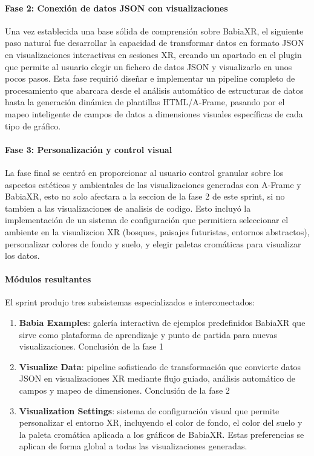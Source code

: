 \documentclass[a4paper, 12pt]{book}
\begin{document}
\paragraph{Fase 2: Conexión de datos JSON con visualizaciones}
Una vez establecida una base sólida de comprensión sobre BabiaXR, el siguiente paso natural fue desarrollar la capacidad de transformar datos en formato JSON en visualizaciones interactivas en sesiones XR, creando un apartado en el plugin que permite al usuario elegir un fichero de datos JSON y visualizarlo en unos pocos pasos. Esta fase requirió diseñar e implementar un pipeline completo de procesamiento que abarcara desde el análisis automático de estructuras de datos hasta la generación dinámica de plantillas HTML/A-Frame, pasando por el mapeo inteligente de campos de datos a dimensiones visuales específicas de cada tipo de gráfico.

\paragraph{Fase 3: Personalización y control visual}
La fase final se centró en proporcionar al usuario control granular sobre los aspectos estéticos y ambientales de las visualizaciones generadas con A-Frame y BabiaXR, esto no solo afectara a la seccion de la fase 2 de este sprint, si no tambien a las visualizaciones de analisis de codigo. Esto incluyó la implementación de un sistema de configuración que permitiera seleccionar el ambiente en la visualizcion XR (bosques, paisajes futuristas, entornos abstractos), personalizar colores de fondo y suelo, y elegir paletas cromáticas para visualizar los datos.


\paragraph{Módulos resultantes}
El sprint produjo tres subsistemas especializados e interconectados:
\begin{enumerate}
  \item \textbf{Babia Examples}: galería interactiva de ejemplos predefinidos BabiaXR que sirve como plataforma de aprendizaje y punto de partida para nuevas visualizaciones. Conclusión de la fase 1
  \item \textbf{Visualize Data}: pipeline sofisticado de transformación que convierte datos JSON en visualizaciones XR mediante flujo guiado, análisis automático de campos y mapeo de dimensiones. Conclusión de la fase 2
\item \textbf{Visualization Settings}: sistema de configuración visual que permite personalizar el entorno XR, incluyendo el color de fondo, el color del suelo y la paleta cromática aplicada a los gráficos de BabiaXR. Estas preferencias se aplican de forma global a todas las visualizaciones generadas.
\end{enumerate}
\end{document}
